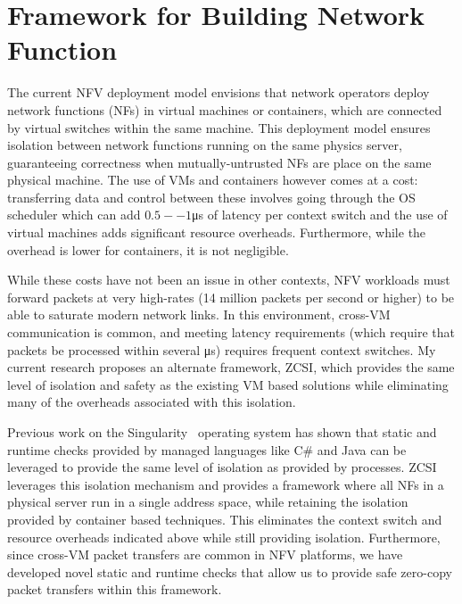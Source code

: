\documentclass[letterpaper]{article}
\begin{document}
\section*{Framework for Building Network Function}
The current NFV deployment model envisions that network operators deploy network functions (NFs) in virtual
machines or containers, which are connected by virtual switches within the same machine. This deployment model ensures isolation
between network functions running on the same physics server, guaranteeing correctness when mutually-untrusted NFs are place on
the same physical machine. The use of VMs and containers however comes at a cost: transferring data and control between these involves
going through the OS scheduler which can add $0.5 -- 1$\si{\micro\second} of latency per context switch and the use of virtual
machines adds significant resource overheads. Furthermore, while the overhead is lower for containers, it is not 
negligible.

While these costs have not been an issue in other contexts, NFV workloads must forward packets at very high-rates (14
million packets per second or higher) to be able to saturate modern network links. In this environment, cross-VM
communication is common, and meeting latency requirements (which require that packets be processed within several
\si{\micro\second}) requires frequent context switches. My current research proposes an alternate framework, ZCSI, which
provides the same level of isolation and safety as the existing VM based solutions while eliminating many of the
overheads associated with this isolation.

Previous work on the Singularity~\cite{hunt2007singularity} operating system has shown that static and runtime checks 
provided by managed languages like C\# and Java can be leveraged to provide the same level of isolation as provided by
processes. ZCSI leverages this isolation mechanism and provides a framework where all NFs in a physical server run in
a single address space, while retaining the isolation provided by container based techniques. This eliminates the
context switch and resource overheads indicated above while still providing isolation. Furthermore, since cross-VM
packet transfers are common in NFV platforms, we have developed novel static and runtime checks that allow us to provide
safe zero-copy packet transfers within this framework.
\end{document}
